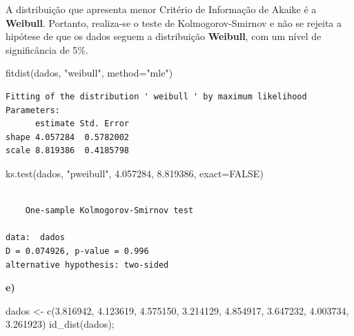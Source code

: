 \documentclass[
  letterpaper,
  DIV=11,
  numbers=noendperiod]{scrartcl}
\newenvironment{Shaded}{\begin{snugshade}}{\end{snugshade}}
\newcommand{\AttributeTok}[1]{\textcolor[rgb]{0.40,0.45,0.13}{#1}}
\newcommand{\ConstantTok}[1]{\textcolor[rgb]{0.56,0.35,0.01}{#1}}
\newcommand{\FloatTok}[1]{\textcolor[rgb]{0.68,0.00,0.00}{#1}}
\newcommand{\FunctionTok}[1]{\textcolor[rgb]{0.28,0.35,0.67}{#1}}
\newcommand{\NormalTok}[1]{\textcolor[rgb]{0.00,0.23,0.31}{#1}}
\newcommand{\OtherTok}[1]{\textcolor[rgb]{0.00,0.23,0.31}{#1}}
\newcommand{\StringTok}[1]{\textcolor[rgb]{0.13,0.47,0.30}{#1}}
\begin{document}
A distribuição que apresenta menor Critério de Informação de Akaike é a
\textbf{Weibull}. Portanto, realiza-se o teste de Kolmogorov-Smirnov e
não se rejeita a hipótese de que os dados seguem a distribuição
\textbf{Weibull}, com um nível de significância de 5\%.

\begin{Shaded}
\begin{Highlighting}[]
\FunctionTok{fitdist}\NormalTok{(dados, }\StringTok{"weibull"}\NormalTok{, }\AttributeTok{method=}\StringTok{"mle"}\NormalTok{)}
\end{Highlighting}
\end{Shaded}

\begin{verbatim}
Fitting of the distribution ' weibull ' by maximum likelihood 
Parameters:
      estimate Std. Error
shape 4.057284  0.5782002
scale 8.819386  0.4185798
\end{verbatim}

\begin{Shaded}
\begin{Highlighting}[]
\FunctionTok{ks.test}\NormalTok{(dados, }\StringTok{"pweibull"}\NormalTok{, }\FloatTok{4.057284}\NormalTok{, }\FloatTok{8.819386}\NormalTok{, }\AttributeTok{exact=}\ConstantTok{FALSE}\NormalTok{)}
\end{Highlighting}
\end{Shaded}

\begin{verbatim}

    One-sample Kolmogorov-Smirnov test

data:  dados
D = 0.074926, p-value = 0.996
alternative hypothesis: two-sided
\end{verbatim}

\textbf{e)}

\begin{Shaded}
\begin{Highlighting}[]
\NormalTok{dados }\OtherTok{\textless{}{-}} \FunctionTok{c}\NormalTok{(}\FloatTok{3.816942}\NormalTok{, }\FloatTok{4.123619}\NormalTok{, }\FloatTok{4.575150}\NormalTok{, }\FloatTok{3.214129}\NormalTok{, }\FloatTok{4.854917}\NormalTok{, }\FloatTok{3.647232}\NormalTok{, }\FloatTok{4.003734}\NormalTok{, }\FloatTok{3.261923}\NormalTok{)}
\FunctionTok{id\_dist}\NormalTok{(dados);}
\end{Highlighting}
\end{Shaded}
\end{document}

